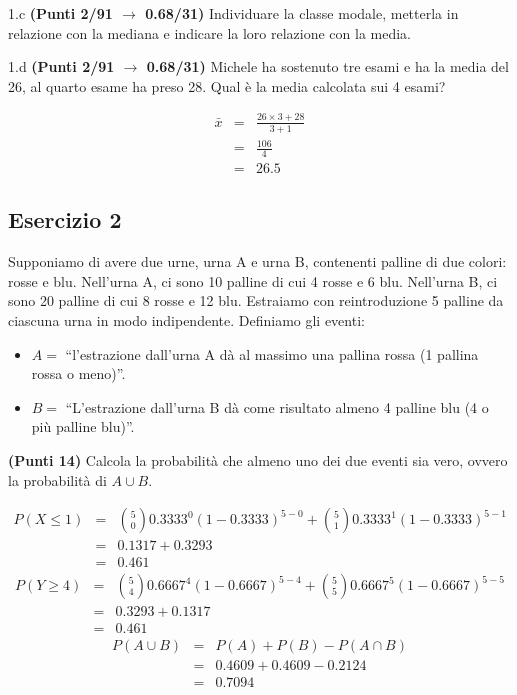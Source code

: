 \documentclass[
  11pt,
]{book}
\providecommand{\tightlist}{%
  \setlength{\itemsep}{0pt}\setlength{\parskip}{0pt}}
\theoremstyle{mytheoremstyle}
\theoremstyle{mydefstyle}
\newenvironment{sol}
  {
  \begin{tcolorbox}[enhanced,breakable,arc=0.1mm,boxrule=1pt,colback=white,colframe=iblue,
  title=\bf \fontfamily{lmss}\selectfont \hspace{.5 cm} Soluzione,drop fuzzy shadow]

}{
\end{tcolorbox}
  }
\begin{document}
1.c \textbf{(Punti 2/91 \(\rightarrow\) 0.68/31)} Individuare la classe modale, metterla in relazione con la mediana e indicare la loro relazione con la media.

1.d \textbf{(Punti 2/91 \(\rightarrow\) 0.68/31)} Michele ha sostenuto tre esami e ha la media del 26, al quarto esame ha preso 28. Qual è la media calcolata sui 4 esami?

\begin{sol}
\begin{eqnarray*}
  \bar x &=&\frac {26\times 3+28}{3+1}\\
  &=& \frac {106}{4}\\
  &=& 26.5
\end{eqnarray*}

\end{sol}

\subsection{Esercizio 2}\label{esercizio-2-33}

Supponiamo di avere due urne, urna A e urna B, contenenti palline di due colori: rosse e blu.
Nell'urna A, ci sono 10 palline di cui 4 rosse e 6 blu. Nell'urna B, ci sono 20 palline di cui 8 rosse e 12 blu.
Estraiamo con reintroduzione 5 palline da ciascuna urna in modo indipendente.
Definiamo gli eventi:

\begin{itemize}
\tightlist
\item
  \(A=\) ``l'estrazione dall'urna A dà al massimo una pallina rossa (1 pallina rossa o meno)''.
\item
  \(B=\) ``L'estrazione dall'urna B dà come risultato almeno 4 palline blu (4 o più palline blu)''.
\end{itemize}

\textbf{(Punti 14)} Calcola la probabilità che almeno uno dei due eventi sia vero, ovvero la probabilità di \(A \cup B\).

\begin{sol}
\normalsize 
\begin{eqnarray*}
      P( X \leq 1 ) &=& \binom{ 5 }{ 0 } 0.3333 ^{ 0 }(1- 0.3333 )^{ 5 - 0 }+\binom{ 5 }{ 1 } 0.3333 ^{ 1 }(1- 0.3333 )^{ 5 - 1 } \\                 &=& 0.1317+0.3293 \\                 &=& 0.461 
   \end{eqnarray*}
\normalsize  \normalsize 
\begin{eqnarray*}
      P( Y \geq 4 ) &=& \binom{ 5 }{ 4 } 0.6667 ^{ 4 }(1- 0.6667 )^{ 5 - 4 }+\binom{ 5 }{ 5 } 0.6667 ^{ 5 }(1- 0.6667 )^{ 5 - 5 } \\                 &=& 0.3293+0.1317 \\                 &=& 0.461 
   \end{eqnarray*}
\normalsize 
\begin{eqnarray*}
  P(A\cup B) &=&  P(A)+P(B)-P(A\cap B)\\
  &=& 0.4609+0.4609-0.2124\\
  &=& 0.7094
\end{eqnarray*}

\end{sol}
\end{document}
